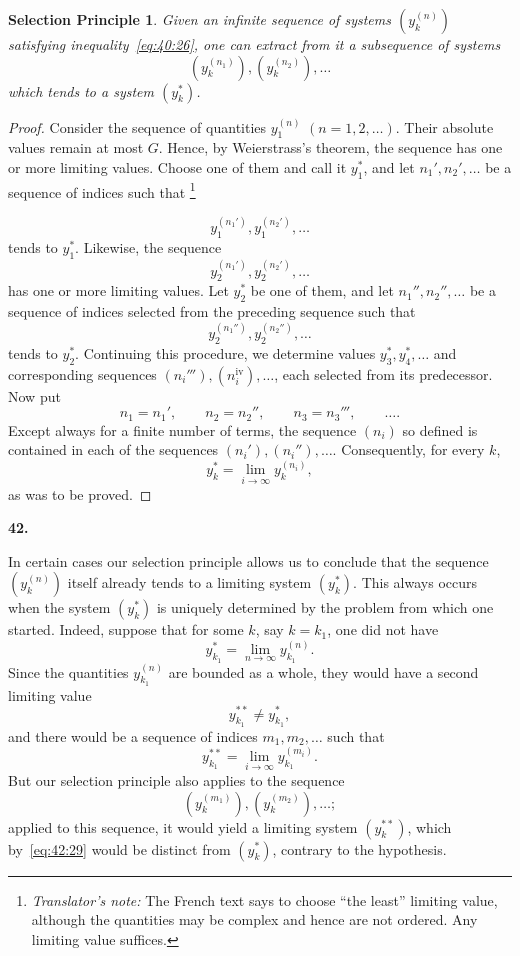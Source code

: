 \documentclass[
  paper=b5,
  fontsize=13pt,
  twoside=true,
  open=any,
  bookmarkpackage=false,
  chapterprefix=true,
  headings=normal
]{scrbook}
\newtheorem*{selectionprinciple}{Selection Principle}
\theoremstyle{definition}
\newcommand{\numberedparagraph}[1]{%
  \par\medskip\phantomsection\label{sec:#1}%
  \noindent\textbf{#1.}\enspace
}
\newcounter{translatornote}
\newcommand{\translatornotelabel}{T\arabic{translatornote}}
\newcommand{\translatornote}[1]{%
  \stepcounter{translatornote}%
  \begingroup
    \edef\savedfootnotenumber{\number\value{footnote}}%
    \renewcommand{\thefootnote}{\translatornotelabel}%
    \footnote{\emph{Translator's note:} #1}%
    \setcounter{footnote}{\savedfootnotenumber}%
  \endgroup
}
\begin{document}
\begin{selectionprinciple}
Given an infinite sequence of systems $(y_k^{(n)})$ satisfying inequality~\eqref{eq:40:26}, one can extract from it a subsequence of systems
\[
 (y_k^{(n_1)}),(y_k^{(n_2)}),\ldots
\]
which tends to a system $(y_k^*)$.
\end{selectionprinciple}
\begin{proof}
Consider the sequence of quantities $y_1^{(n)}$ $(n=1,2,\ldots)$. Their absolute values remain at most $G$. Hence, by Weierstrass's theorem, the sequence has one or more limiting values. Choose one of them and call it $y_1^*$, and let $n_1',n_2',\ldots$ be a sequence of indices such that\translatornote{The French text says to choose ``the least'' limiting value, although the quantities may be complex and hence are not ordered.  Any limiting value suffices.}
\[
 y_1^{(n_1')},y_1^{(n_2')},\ldots
\]
tends to $y_1^*$. Likewise, the sequence
\[
 y_2^{(n_1')},y_2^{(n_2')},\ldots
\]
has one or more limiting values. Let $y_2^*$ be one of them, and let $n_1'',n_2'',\ldots$ be a sequence of indices selected from the preceding sequence such that
\[
 y_2^{(n_1'')},y_2^{(n_2'')},\ldots
\]
tends to $y_2^*$. Continuing this procedure, we determine values $y_3^*,y_4^*,\ldots$ and corresponding sequences $(n_i'''),(n_i^{\mathrm{iv}}),\ldots$, each selected from its predecessor. Now put
\[
 n_1=n_1',\qquad n_2=n_2'',\qquad n_3=n_3''',\qquad\ldots.
\]
Except always for a finite number of terms, the sequence $(n_i)$ so defined is contained in each of the sequences $(n_i'),(n_i''),\ldots$. Consequently, for every $k$,
\[
 y_k^*=\lim_{i\to\infty}y_k^{(n_i)},
\]
as was to be proved.
\end{proof}

\numberedparagraph{42}
In certain cases our selection principle allows us to conclude that the sequence $(y_k^{(n)})$ itself already tends to a limiting system $(y_k^*)$. This always occurs when the system $(y_k^*)$ is uniquely
determined by the problem from which one started. Indeed, suppose that for some $k$, say $k=k_1$, one did not have
\[
 y_{k_1}^*=\lim_{n\to\infty}y_{k_1}^{(n)}.
\]
Since the quantities $y_{k_1}^{(n)}$ are bounded as a whole, they would have a second limiting value
\begin{equation}
 y_{k_1}^{**}\ne y_{k_1}^*,
 \tag{29}\label{eq:42:29}
\end{equation}
and there would be a sequence of indices $m_1,m_2,\ldots$ such that
\[
 y_{k_1}^{**}=\lim_{i\to\infty}y_{k_1}^{(m_i)}.
\]
But our selection principle also applies to the sequence
\[
 (y_k^{(m_1)}),(y_k^{(m_2)}),\ldots;
\]
applied to this sequence, it would yield a limiting system $(y_k^{**})$, which by~\eqref{eq:42:29} would be distinct from $(y_k^*)$, contrary to the hypothesis.
\end{document}
